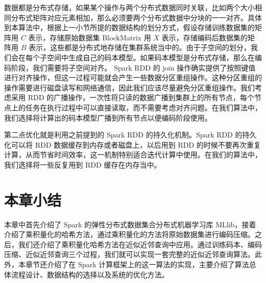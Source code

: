 数据都是分布式存储，如果某个操作与两个分布式数据同时关联，比如两个大小相同分布式矩阵对应元素相加，那么必须要两个分布式数据中分块的一一对齐。具体到本算法中，根据上一小节所提的数据结构的划分方式，假设存储训练数据集的矩阵用 $C$ 表示，存储原始数据集 BlockMatrix 用 $X$ 表示，存储编码后数据集的矩阵用 $B$ 表示，这些都是分布式地存储在集群系统当中的。由于子空间的划分，我们会在每个子空间中生成自己的码本模型。如果码本模型是分布式存储，那么在编码阶段，我们需要将子空间对齐。 Spark RDD 的 join 操作确实提供了按照键值进行对齐操作，但这一过程可能就会产生一些数据分区重组操作。这种分区重组的操作需要进行磁盘读写和网络通信，因此我们应该尽量避免分区重组操作。我们考虑采用 RDD 的广播操作，一次性将只读的数据广播到集群上的所有节点，每个节点上的任务在执行过程中可以直接读取，而不需要考虑对齐问题。在我们算法中，我们选择将计算出的码本模型广播到所有节点以便编码阶段使用。

第二点优化就是利用之前提到的 Spark RDD 的持久化机制。Spark RDD 的持久化可以将 RDD 数据缓存到内存或者磁盘上，以后用到 RDD 的时候不要再次重复计算，从而节省时间效率，这一机制特别适合迭代计算中使用。在我们的算法中，我们选择将一些反复用到 RDD 缓存在内存当中。
\section{本章小结}
本章中首先介绍了 Spark 的弹性分布式数据集合分布式机器学习库 MLlib，接着介绍了乘积量化的哈希方法，通过乘积量化的方法将原始数据集进行编码压缩。之后，我们还介绍了乘积量化哈希方法在近似近邻查询中应用。通过训练码本、编码压缩、近似近邻查询三个过程，我们就可以实现一套完整的近似近邻查询算法。此外，本章节还介绍了在 Spark 计算框架上的这一算法的实现，主要介绍了算法总体流程设计、数据结构的选择以及系统的优化方法。


